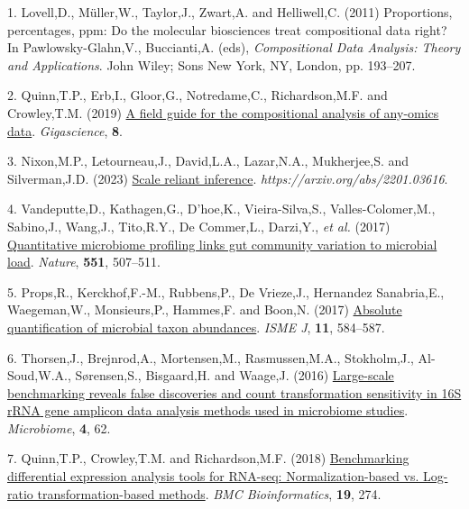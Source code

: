 \documentclass[
]{article}
\newlength{\cslhangindent}
\newenvironment{CSLReferences}[2] %
 {\begin{list}{}{%
  \setlength{\itemindent}{0pt}
  \setlength{\leftmargin}{0pt}
  \setlength{\parsep}{0pt}
  \ifodd #1
   \setlength{\leftmargin}{\cslhangindent}
   \setlength{\itemindent}{-1\cslhangindent}
  \fi
  \setlength{\itemsep}{#2\baselineskip}}}
 {\end{list}}
\begin{document}
\label{refs}
\begin{CSLReferences}{1}{1}
1. Lovell,D., Müller,W., Taylor,J., Zwart,A. and Helliwell,C. (2011)
Proportions, percentages, ppm: Do the molecular biosciences treat
compositional data right? In Pawlowsky-Glahn,V., Buccianti,A. (eds),
\emph{Compositional Data Analysis: Theory and Applications}. John Wiley;
Sons New York, NY, London, pp. 193--207.

2. Quinn,T.P., Erb,I., Gloor,G., Notredame,C., Richardson,M.F. and
Crowley,T.M. (2019) \href{https://doi.org/10.1093/gigascience/giz107}{A
field guide for the compositional analysis of any-omics data}.
\emph{Gigascience}, \textbf{8}.

3. Nixon,M.P., Letourneau,J., David,L.A., Lazar,N.A., Mukherjee,S. and
Silverman,J.D. (2023) \href{https://arxiv.org/abs/2201.03616}{Scale
reliant inference}. \emph{https://arxiv.org/abs/2201.03616}.

4. Vandeputte,D., Kathagen,G., D'hoe,K., Vieira-Silva,S.,
Valles-Colomer,M., Sabino,J., Wang,J., Tito,R.Y., De Commer,L.,
Darzi,Y., \emph{et al.} (2017)
\href{https://doi.org/10.1038/nature24460}{Quantitative microbiome
profiling links gut community variation to microbial load}.
\emph{Nature}, \textbf{551}, 507--511.

5. Props,R., Kerckhof,F.-M., Rubbens,P., De Vrieze,J., Hernandez
Sanabria,E., Waegeman,W., Monsieurs,P., Hammes,F. and Boon,N. (2017)
\href{https://doi.org/10.1038/ismej.2016.117}{Absolute quantification of
microbial taxon abundances}. \emph{ISME J}, \textbf{11}, 584--587.

6. Thorsen,J., Brejnrod,A., Mortensen,M., Rasmussen,M.A., Stokholm,J.,
Al-Soud,W.A., Sørensen,S., Bisgaard,H. and Waage,J. (2016)
\href{https://doi.org/10.1186/s40168-016-0208-8}{Large-scale
benchmarking reveals false discoveries and count transformation
sensitivity in 16{S} r{RNA} gene amplicon data analysis methods used in
microbiome studies}. \emph{Microbiome}, \textbf{4}, 62.

7. Quinn,T.P., Crowley,T.M. and Richardson,M.F. (2018)
\href{https://doi.org/10.1186/s12859-018-2261-8}{Benchmarking
differential expression analysis tools for RNA-seq: Normalization-based
vs. Log-ratio transformation-based methods}. \emph{BMC Bioinformatics},
\textbf{19}, 274.


\end{CSLReferences}
\end{document}
